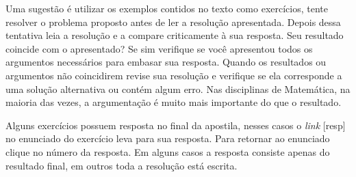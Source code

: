 Uma sugestão é utilizar os exemplos contidos no texto como exercícios, tente resolver
o problema proposto antes de ler a resolução apresentada. Depois dessa tentativa leia
a resolução e a compare criticamente à sua resposta.
Seu resultado coincide com o apresentado? Se sim verifique se você apresentou todos os
argumentos necessários para embasar sua resposta.
Quando os resultados ou argumentos não coincidirem revise
sua resolução e verifique se ela corresponde a uma solução alternativa ou contém
algum erro. Nas disciplinas de Matemática, na maioria das vezes, a argumentação
é muito mais importante do que o resultado.

Alguns exercícios possuem resposta no final da apostila, nesses casos o
\textit{link} \textcolor{cpLinks}{[resp]} no enunciado do exercício
leva para sua resposta. Para retornar ao enunciado clique no número da resposta.
Em alguns casos a resposta consiste apenas do resultado final, em outros toda a
resolução está escrita.



